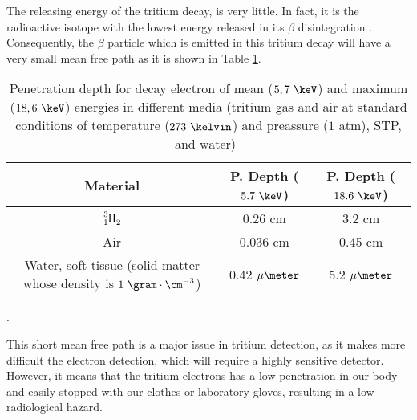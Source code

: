
The releasing energy of the tritium decay, is very little. In fact, it is the radioactive isotope with the lowest energy released in its $\beta$ disintegration \cite{TritiumHandling}. Consequently, the $\beta$ particle which is emitted in this tritium decay will have a very small mean free path as it is shown in Table \ref{tab:MeanFreePathTritium}.

\begin{table}[htbp]
\begin{center}
\begin{tabular}{|c|c|c|}
\hline
Material & P. Depth ($5.7~\keV$) & P. Depth ($18.6~\keV$)\\
\hline \hline \hline
$\ce{\ce{^{3}_{1}H_2}}$ & 0.26 cm & 3.2 cm \\ \hline
Air & 0.036 cm & 0.45 cm \\ \hline
\parbox{10em}{\centering Water, soft tissue\\  (solid matter whose \\  density is $1~\gram\cdot\cm^{-3}$)} & 0.42 $\mu\meter$ & 5.2 $\mu\meter$ \\ \hline
\end{tabular}
\caption{Penetration depth for decay electron of mean ($5,7~\keV$) and maximum ($18,6~\keV$) energies in different media (tritium gas and air at standard conditions of temperature ($273~\kelvin$) and preassure ($1$ atm), STP, and water)~\cite{MeanFreePathDocument}}.
\label{tab:MeanFreePathTritium}
\end{center}
\end{table}

This short mean free path is a major issue in tritium detection, as it makes more difficult the electron detection, which will require a highly sensitive detector. However, it means that the tritium electrons has a low penetration in our body and easily stopped with our clothes or laboratory gloves, resulting in a low radiological hazard.

